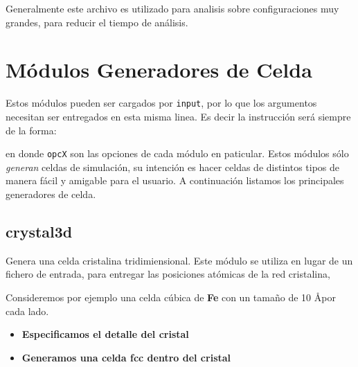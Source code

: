 Generalmente este archivo es utilizado para analisis sobre configuraciones muy grandes, para reducir el tiempo de an\'alisis.

\section{M\'odulos Generadores de Celda}
\label{chap:modulos:generadores}
Estos m\'odulos pueden ser cargados por \verb|input|, por lo que los argumentos necesitan ser entregados en esta misma linea. Es decir la instrucci\'on ser\'a siempre de la forma:


en donde \verb|opcX| son las opciones de cada m\'odulo en paticular. Estos m\'odulos s\'olo \textit{generan} celdas de simulaci\'on, su intenci\'on es hacer celdas de distintos tipos de manera f\'acil y amigable para el usuario. A continuaci\'on listamos los principales generadores de celda.

\subsection{crystal3d}
Genera una celda cristalina tridimiensional. Este m\'odulo se utiliza en lugar de un fichero de entrada, para entregar las posiciones at\'omicas de la red cristalina, 


Consideremos por ejemplo una celda c\'ubica de \textbf{Fe} con un tama\~no de 10 \AA por cada lado.

\begin{itemize}
 \item \textbf{Especificamos el detalle del cristal}
 \item \textbf{Generamos una celda  fcc dentro del cristal}
\end{itemize}


